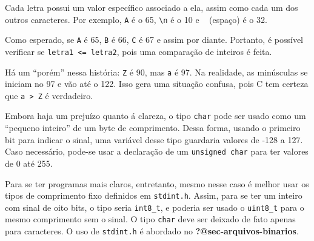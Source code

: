 \documentclass[
  11pt,
  a4paper,
]{scrbook}
\begin{document}
\begin{tcolorbox}[enhanced jigsaw, arc=.35mm, bottomtitle=1mm, colbacktitle=quarto-callout-warning-color!10!white, title=\textcolor{quarto-callout-warning-color}{\faExclamationTriangle}\hspace{0.5em}{Curiosidade}, toprule=.15mm, left=2mm, opacityback=0, colback=white, colframe=quarto-callout-warning-color-frame, opacitybacktitle=0.6, bottomrule=.15mm, leftrule=.75mm, toptitle=1mm, coltitle=black, titlerule=0mm, rightrule=.15mm, breakable]

Cada letra possui um valor específico associado a ela, assim como cada
um dos outros caracteres. Por exemplo,
\texttt{\textquotesingle{}A\textquotesingle{}} é o 65,
\texttt{\textquotesingle{}\textbackslash{}n\textquotesingle{}} é o 10 e
\texttt{\textquotesingle{}\ \textquotesingle{}} (espaço) é o 32.

Como esperado, se \texttt{\textquotesingle{}A\textquotesingle{}} é 65,
\texttt{\textquotesingle{}B\textquotesingle{}} é 66,
\texttt{\textquotesingle{}C\textquotesingle{}} é 67 e assim por diante.
Portanto, é possível verificar se \texttt{letra1\ \textless{}=\ letra2},
pois uma comparação de inteiros é feita.

Há um ``porém'' nessa história:
\texttt{\textquotesingle{}Z\textquotesingle{}} é 90, mas
\texttt{\textquotesingle{}a\textquotesingle{}} é 97. Na realidade, as
minúsculas se iniciam no 97 e vão até o 122. Isso gera uma situação
confusa, pois C tem certeza que
\texttt{\textquotesingle{}a\textquotesingle{}\ \textgreater{}\ \textquotesingle{}Z\textquotesingle{}}
é verdadeiro.

\end{tcolorbox}

\begin{tcolorbox}[enhanced jigsaw, arc=.35mm, bottomtitle=1mm, colbacktitle=quarto-callout-tip-color!10!white, title=\textcolor{quarto-callout-tip-color}{\faLightbulb}\hspace{0.5em}{Dica}, toprule=.15mm, left=2mm, opacityback=0, colback=white, colframe=quarto-callout-tip-color-frame, opacitybacktitle=0.6, bottomrule=.15mm, leftrule=.75mm, toptitle=1mm, coltitle=black, titlerule=0mm, rightrule=.15mm, breakable]

Embora haja um prejuízo quanto á clareza, o tipo \texttt{char} pode ser
usado como um ``pequeno inteiro'' de um byte de comprimento. Dessa
forma, usando o primeiro bit para indicar o sinal, uma variável desse
tipo guardaria valores de -128 a 127. Caso necessário, pode-se usar a
declaração de um \texttt{unsigned\ char} para ter valores de 0 até 255.

Para se ter programas mais claros, entretanto, mesmo nesse caso é melhor
usar os tipos de comprimento fixo definidos em \texttt{stdint.h}. Assim,
para se ter um inteiro com sinal de oito bits, o tipo seria
\texttt{int8\_t}, e poderia ser usado o \texttt{uint8\_t} para o mesmo
comprimento sem o sinal. O tipo \texttt{char} deve ser deixado de fato
apenas para caracteres. O uso de \texttt{stdint.h} é abordado no
\textbf{?@sec-arquivos-binarios}.

\end{tcolorbox}
\end{document}

